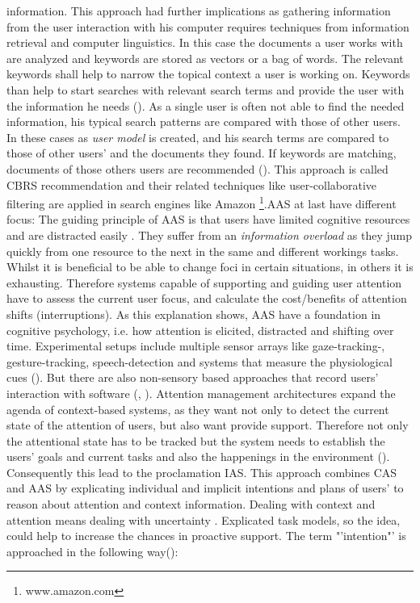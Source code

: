 information. This approach had further implications as gathering information from the user interaction with his computer requires techniques from information retrieval and computer linguistics. In this case the documents a user works with are analyzed and keywords are stored as vectors or a bag of words. The relevant keywords shall help to narrow the topical context a user is working on. Keywords than help to start searches with relevant search terms and provide the user with the information he needs (\cite{budzik2000user}).  As a single user is often not able to find the needed information, his typical search patterns are compared with those of other users. In these cases as \textit{user model} is created, and his search terms are compared to those of other users' and the documents they found. If keywords are matching, documents of those others users are recommended (\cite{anand2007contextual}). This approach is called \ac{CBRS} recommendation and their related techniques like user-collaborative filtering are applied in search engines like Amazon \footnote{www.amazon.com}.\ac{AAS} at last have different focus: The guiding principle of \acs{AAS} is that users have limited cognitive resources and are distracted easily . They suffer from an \textit{information overload} as they jump quickly from one resource to the next in the same and different workings tasks. Whilst it is beneficial to be able to change foci in certain situations, in others it is exhausting. Therefore systems capable of supporting and guiding user attention have to assess the current user focus, and calculate the cost/benefits of attention shifts (interruptions). As this explanation shows, \acs{AAS} have a foundation in cognitive psychology, i.e. how attention is elicited, distracted and shifting over time. Experimental setups include multiple sensor arrays like  gaze-tracking-, gesture-tracking, speech-detection and systems that measure the physiological cues (\cite{roda2006attention}). But there are also non-sensory based approaches that record users' interaction with software (\cite{horvitz2003models}, \cite{schmitz2011contextualized}). Attention management architectures expand the agenda of context-based systems, as they want not only to detect the current state of the attention of users, but also want provide support. Therefore not only the attentional state has to be tracked but the system needs to establish the users' goals and current tasks and also the happenings in the environment (\cite{roda2006attention}). Consequently this lead to the proclamation \ac{IAS}. This approach combines \acs{CAS} and \acs{AAS} by explicating individual and implicit intentions and plans of users' to reason about attention and context information. Dealing with context and attention means dealing with uncertainty . Explicated task models, so the idea, could help to increase the chances in proactive support. The term "'intention"' is  approached in the following way(\cite{cohen1990intention}):
